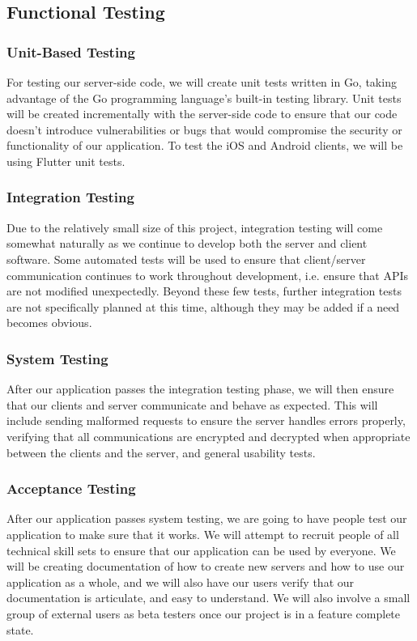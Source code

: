 \documentclass[11pt]{article}
\begin{document}
\subsection{Functional Testing}
\subsubsection*{Unit-Based Testing}
For testing our server-side code, we will create unit tests written in Go, taking advantage of the Go programming language’s built-in testing library. Unit tests will be created incrementally with the server-side code to ensure that our code doesn’t introduce vulnerabilities or bugs that would compromise the security or functionality of our application. To test the iOS and Android clients, we will be using Flutter unit tests.

\subsubsection*{Integration Testing}
Due to the relatively small size of this project, integration testing will come somewhat naturally as we continue to develop both the server and client software. Some automated tests will be used to ensure that client/server communication continues to work throughout development, i.e. ensure that APIs are not modified unexpectedly. Beyond these few tests, further integration tests are not specifically planned at this time, although they may be added if a need becomes obvious. 

\subsubsection*{System Testing}
After our application passes the integration testing phase, we will then ensure that our clients and server communicate and behave as expected. This will include sending malformed requests to ensure the server handles errors properly, verifying that all communications are encrypted and decrypted when appropriate between the clients and the server, and general usability tests.

\subsubsection*{Acceptance Testing}
After our application passes system testing, we are going to have people test our application to make sure that it works. We will attempt to recruit people of all technical skill sets to ensure that our application can be used by everyone. We will be creating documentation of how to create new servers and how to use our application as a whole, and we will also have our users verify that our documentation is articulate, and easy to understand. We will also involve a small group of external users as beta testers once our project is in a feature complete state.
\end{document}
